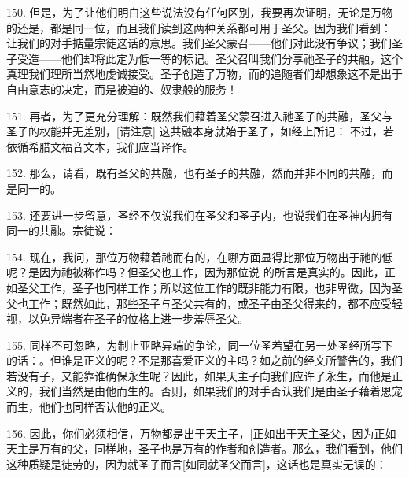 150. 但是，为了让他们明白这些说法没有任何区别，我要再次证明，无论是万物的还是，都是同一位，而且我们读到这两种关系都可用于圣父。因为我们看到： 让我们的对手掂量宗徒这话的意思。我们圣父蒙召——他们对此没有争议；我们圣子受造——他们却将此定为低一等的标记。圣父召叫我们分享祂圣子的共融，这个真理我们理所当然地虔诚接受。圣子创造了万物，而的追随者们却想象这不是出于自由意志的决定，而是被迫的、奴隶般的服务！\par

151. 再者，为了更充分理解：既然我们藉着圣父蒙召进入祂圣子的共融，圣父与圣子的权能并无差别，[请注意] 这共融本身就始于圣子，如经上所记： 不过，若依循希腊文福音文本，我们应当译作。\par

152. 那么，请看，既有圣父的共融，也有圣子的共融，然而并非不同的共融，而是同一的。\par

153. 还要进一步留意，圣经不仅说我们在圣父和圣子内，也说我们在圣神内拥有同一的共融。宗徒说：\par

154. 现在，我问，那位万物藉着祂而有的，在哪方面显得比那位万物出于祂的低呢？是因为祂被称作吗？但圣父也工作，因为那位说 的所言是真实的。因此，正如圣父工作，圣子也同样工作；所以这位工作的既非能力有限，也非卑微，因为圣父也工作；既然如此，那些圣子与圣父共有的，或圣子由圣父得来的，都不应受轻视，以免异端者在圣子的位格上进一步羞辱圣父。\par

155. 同样不可忽略，为制止亚略异端的争论，同一位圣若望在另一处圣经所写下的话：。但谁是正义的呢？不是那喜爱正义的主吗？如之前的经文所警告的，我们若没有子，又能靠谁确保永生呢？因此，如果天主子向我们应许了永生，而他是正义的，我们当然是由他而生的。否则，如果我们的对手否认我们是由圣子藉着恩宠而生，他们也同样否认他的正义。\par

156. 因此，你们必须相信，万物都是出于天主子，[正如出于天主圣父，因为正如天主是万有的父，同样地，圣子也是万有的作者和创造者。那么，我们看到，他们这种质疑是徒劳的，因为就圣子而言[如同就圣父而言]，这话也是真实无误的：\par

